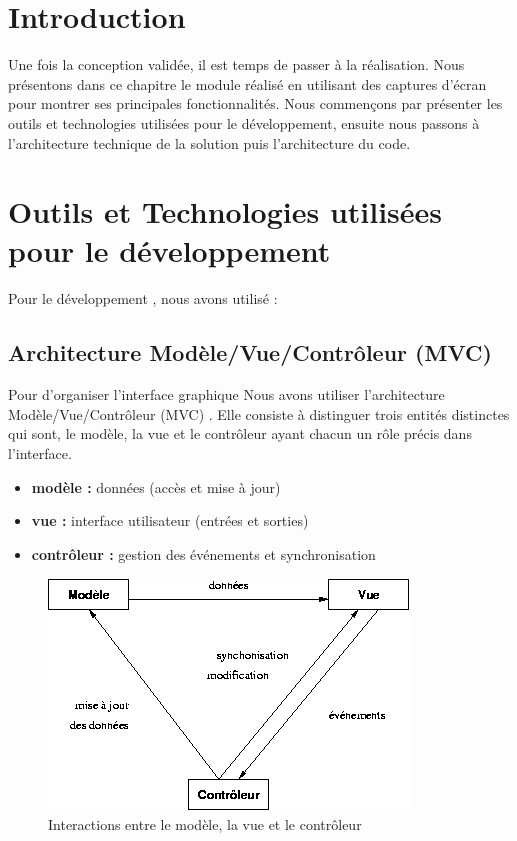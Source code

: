 \section{Introduction}
Une fois la conception validée, il est temps de passer à la réalisation. Nous présentons dans ce chapitre le module réalisé en utilisant des captures d’écran pour montrer ses principales fonctionnalités. Nous commençons par présenter les outils et technologies utilisées pour le développement, ensuite nous passons à l’architecture technique de la solution puis l’architecture du code.

\section{Outils et Technologies utilisées pour le développement}
Pour le développement , nous avons utilisé : 

    \subsection{Architecture Modèle/Vue/Contrôleur (MVC)}


Pour d'organiser  l'interface graphique Nous avons utiliser l'architecture Modèle/Vue/Contrôleur (MVC) . Elle consiste à distinguer trois entités distinctes qui sont, le modèle, la vue et le contrôleur ayant chacun un rôle précis dans l'interface. \parencite{mvc}

\begin{itemize}
	\item 	\textbf{modèle :} données (accès et mise à jour)
	\item 	\textbf{vue :} interface utilisateur (entrées et sorties)
	\item 	\textbf{contrôleur :} gestion des événements et synchronisation
\end{itemize}


\begin{figure}[H]
	\centering
	\includegraphics[width=0.6\linewidth]{images/mvc}
	\caption{Interactions entre le modèle, la vue et le contrôleur \parencite{mvc}}
	\label{fig:mvc}
\end{figure}

